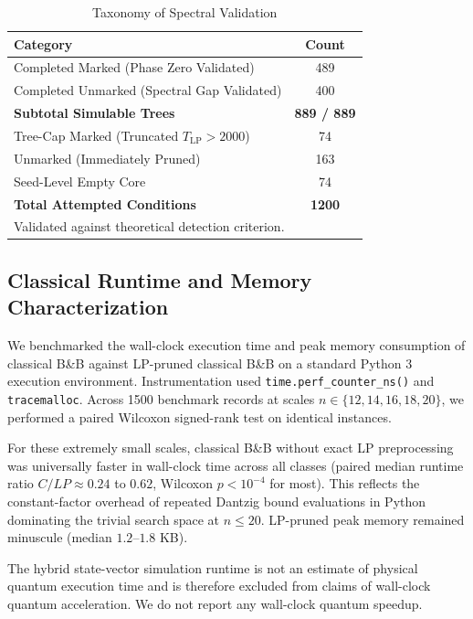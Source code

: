 \documentclass[conference]{IEEEtran} \IEEEoverridecommandlockouts
\begin{document}
\begin{table}[htbp] \caption{Taxonomy of Spectral Validation} \label{tab:measured} \begin{center} \begin{tabular}{lc} \toprule \textbf{Category} & \textbf{Count} \\ \midrule Completed Marked (Phase Zero Validated) & 489 \\ Completed Unmarked (Spectral Gap Validated) & 400 \\ \midrule \textbf{Subtotal Simulable Trees} & \textbf{889 / 889} \\ \midrule Tree-Cap Marked (Truncated $T_{\text{LP}} > 2000$) & 74 \\ Unmarked (Immediately Pruned) & 163 \\ Seed-Level Empty Core & 74 \\ \midrule \textbf{Total Attempted Conditions} & \textbf{1200} \\ \bottomrule \multicolumn{2}{p{\columnwidth}}{\footnotesize Validated against theoretical detection criterion.} \end{tabular} \end{center} \end{table}

\subsection{Classical Runtime and Memory Characterization}
We benchmarked the wall-clock execution time and peak memory consumption of classical B\&B against LP-pruned classical B\&B on a standard Python 3 execution environment. Instrumentation used \texttt{time.perf\_counter\_ns()} and \texttt{tracemalloc}. Across 1500 benchmark records at scales $n \in \{12, 14, 16, 18, 20\}$, we performed a paired Wilcoxon signed-rank test on identical instances. 

For these extremely small scales, classical B\&B without exact LP preprocessing was universally faster in wall-clock time across all classes (paired median runtime ratio $C/LP \approx 0.24$ to $0.62$, Wilcoxon $p < 10^{-4}$ for most). This reflects the constant-factor overhead of repeated Dantzig bound evaluations in Python dominating the trivial search space at $n \le 20$. LP-pruned peak memory remained minuscule (median $1.2\text{--}1.8$ KB). 

The hybrid state-vector simulation runtime is not an estimate of physical quantum execution time and is therefore excluded from claims of wall-clock quantum acceleration. We do not report any wall-clock quantum speedup.
\end{document}
